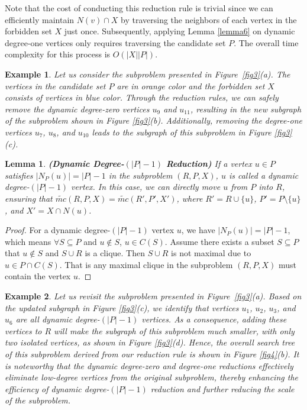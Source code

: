 \documentclass[sigconf, nonacm]{acmart}
\newtheorem{lem}[thm]{\bf Lemma}
\newtheorem{exmp}{Example}%
\begin{document}
Note that the cost of conducting this reduction rule is trivial since we can efficiently maintain $N(v) \cap X$ by traversing the neighbors of each vertex in the forbidden set $X$ just once. Subsequently, applying Lemma \ref{lemma6} on dynamic degree-one vertices only requires traversing the candidate set $P$. The overall time complexity for this process is $O(\lvert X\rvert\lvert P\rvert)$.

\begin{exmp}
  Let us consider the subproblem presented in Figure~\ref{fig3}(a).
The vertices in the candidate set $P$ are in orange color and the forbidden set $X$ consists of vertices in blue color. Through the reduction rules, we can safely 
remove the dynamic degree-zero vertices $u_9$ and $u_{11}$, resulting in the new subgraph of the subproblem shown in Figure \ref{fig3}(b). Additionally, removing the degree-one vertices $u_7$, $u_8$, and $u_{10}$ leads to the subgraph of this subproblem in Figure \ref{fig3}(c). 
\end{exmp}

\begin{lem}{\textbf{(Dynamic Degree-$(\lvert P\rvert-1)$ Reduction)}}
\textit{If a vertex $u\in P$ satisfies $\lvert N_P(u)\rvert = \lvert P\rvert -1$ in the subproblem $(R,P,X)$, $u$ is called a dynamic degree-$(\lvert P\rvert-1)$ vertex. In this case, we can directly move $u$ from $P$ into $R$, ensuring that $\tilde{mc}(R,P,X) = \tilde{mc}(R',P',X')$, where $R'=R\cup\{u\}$, $P'=P\setminus \{u\}$, and $X'=X\cap N(u)$.
\label{lemma-n-1}}
\end{lem}
\begin{proof}
    For a dynamic degree-$(\lvert P\rvert-1)$ vertex $u$, we have $\lvert N_P(u)\rvert = \lvert P\rvert -1$, which means $\forall S\subseteq P$ and $u\notin S$, $u\in C(S)$. Assume there exists a subset $S\subseteq P$ that $u\notin S$ and $S\cup R$ is a clique. Then $S\cup R$ is not maximal due to $u \in P\cap C(S)$. That is any maximal clique in the subproblem $(R,P,X)$ must contain the vertex $u$.

\end{proof}



\begin{exmp} \label{exmp7}
Let us revisit the subproblem presented in Figure~\ref{fig3}(a). 
Based on the updated subgraph in Figure \ref{fig3}(c), we identify that vertices $u_1$, $u_2$, $u_3$, and $u_6$ are all dynamic degree-$(\lvert P\rvert-1)$ vertices. As a consequence, adding these vertices to $R$ will make the subgraph of this subproblem much smaller, with only two isolated vertices, as shown in Figure \ref{fig3}(d). Hence, the overall search tree of this subproblem derived from our reduction rule is shown in Figure \ref{fig4}(b).
It is noteworthy that the dynamic degree-zero and degree-one reductions effectively eliminate low-degree vertices from the original subproblem, thereby enhancing the efficiency of dynamic degree-$(\lvert P\rvert-1)$ reduction and further reducing the scale of the subproblem.
\end{exmp}
\end{document}
